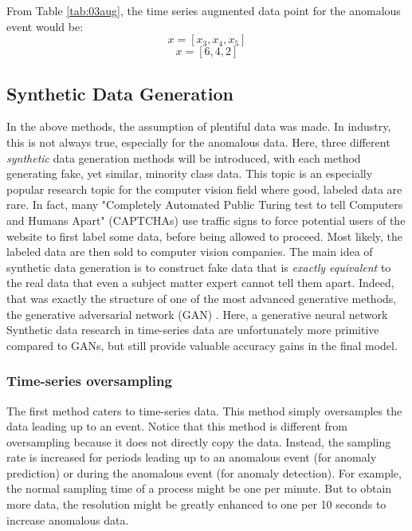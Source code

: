 From Table \ref{tab:03aug}, the time series augmented data point for the anomalous event would be:
$$x = [x_3, x_4, x_5]$$
$$x = [6, 4, 2]$$


\subsection{Synthetic Data Generation}
In the above methods, the assumption of plentiful data was made.  In industry, this is not always true, especially for the anomalous data.  Here, three different \textit{synthetic} data generation methods will be introduced, with each method generating fake, yet similar, minority class data.  This topic is an especially popular research topic for the computer vision field where good, labeled data are rare. In fact, many "Completely Automated Public Turing test to tell Computers and Humans Apart" (CAPTCHAs) use traffic signs to force potential users of the website to first label some data, before being allowed to proceed. Most likely, the labeled data are then sold to computer vision companies. The main idea of synthetic data generation is to construct fake data that is \textit{exactly equivalent} to the real data that even a subject matter expert cannot tell them apart.  Indeed, that was exactly the structure of one of the most advanced generative methods, the generative adversarial network (GAN) \cite{gan}. Here, a generative neural network Synthetic data research in time-series data are unfortunately more primitive compared to GANs, but still provide valuable accuracy gains in the final model. 

\subsubsection{Time-series oversampling}
The first method caters to time-series data. This method simply oversamples the data leading up to an event.  Notice that this method is different from oversampling because it does not directly copy the data.  Instead, the sampling rate is increased for periods leading up to an anomalous event (for anomaly prediction) or during the anomalous event (for anomaly detection).  For example, the normal sampling time of a process might be one per minute. But to obtain more data, the resolution might be greatly enhanced to one per 10 seconds to increase anomalous data.

